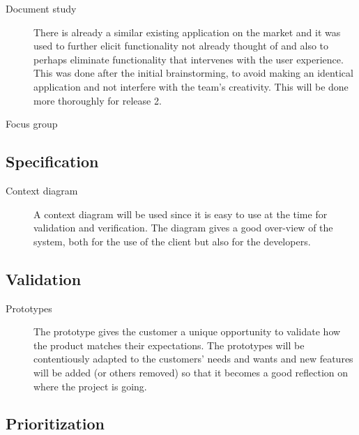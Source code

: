 \documentclass[10pt,a4paper]{article}
\begin{document}
\begin{description}
\item[Document study] There is already a similar existing application on the market and it was used to further elicit functionality not already thought of and also to perhaps eliminate functionality that intervenes with the user experience. This was done after the initial brainstorming, to avoid making an identical application and not interfere with the team's creativity. This will be done more thoroughly for release 2.

\item[Focus group]

\end{description}


\subsection{Specification}

\begin{description}
\item[Context diagram] A context diagram will be used since it is easy to use at the time for validation and verification. The diagram gives a good over-view of the system, both for the use of the client but also for the developers. 
\end{description}

\subsection{Validation}
\begin{description}
\item[Prototypes] The prototype gives the customer a unique opportunity to validate how the product matches their expectations. The prototypes will be contentiously adapted to the customers' needs and wants and new features will be added (or others removed) so that it becomes a good reflection on where the project is going. 
\end{description}


\subsection{Prioritization}
\end{document}
